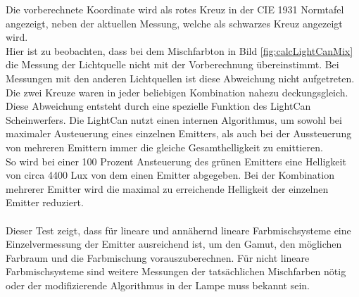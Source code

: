 \documentclass[11pt]{scrartcl}
\begin{document}
\noindent
Die vorberechnete Koordinate wird als rotes Kreuz in der CIE 1931 Normtafel angezeigt, neben der aktuellen Messung, welche als schwarzes Kreuz
angezeigt wird.\\
Hier ist zu beobachten, dass bei dem Mischfarbton in Bild \ref{fig:calcLightCanMix} die Messung der Lichtquelle nicht mit der Vorberechnung
übereinstimmt. Bei Messungen mit den anderen Lichtquellen ist diese Abweichung nicht aufgetreten. Die zwei Kreuze waren in jeder beliebigen
Kombination nahezu deckungsgleich.\\
Diese Abweichung entsteht durch eine spezielle Funktion des LightCan Scheinwerfers. Die LightCan nutzt einen internen Algorithmus, um sowohl bei
maximaler Austeuerung eines einzelnen Emitters, als auch bei der Aussteuerung von mehreren Emittern immer die gleiche Gesamthelligkeit zu
emittieren.\\
So wird bei einer 100 Prozent Ansteuerung des grünen Emitters eine Helligkeit von circa 4400 Lux von dem einen Emitter abgegeben. Bei der
Kombination mehrerer Emitter wird die maximal zu erreichende Helligkeit der einzelnen Emitter reduziert.\\
\\
Dieser Test zeigt, dass für lineare und annähernd lineare Farbmischsysteme eine Einzelvermessung der Emitter ausreichend ist, um den Gamut, den möglichen
Farbraum und die Farbmischung vorauszuberechnen. Für nicht lineare Farbmischsysteme sind weitere Messungen der tatsächlichen Mischfarben nötig oder der
modifizierende Algorithmus in der Lampe muss bekannt sein.
\end{document}
